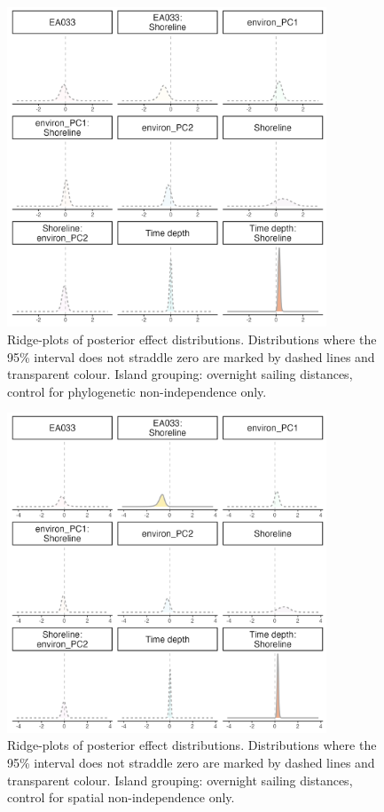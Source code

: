\documentclass[unnumsec,webpdf,modern,medium]{oup-authoring-template}
\begin{document}
\begin{figure}[ht]
\includegraphics[width=0.85\textwidth]{brms_SBZR_control_phylo_group_full_effect_ridge_panels_plot.png}
\caption{Ridge-plots of posterior effect distributions. Distributions where the 95\% interval does not straddle zero are marked by dashed lines and transparent colour. Island grouping: overnight sailing distances, control for phylogenetic non-independence only.}
\label{brms_SBZR_group_full_effect_ridge_panels_phylo}
\end{figure}



\begin{figure}[ht]
\includegraphics[width=0.85\textwidth]{brms_SBZR_control_spatial_group_full_effect_ridge_panels_plot.png}
\caption{Ridge-plots of posterior effect distributions. Distributions where the 95\% interval does not straddle zero are marked by dashed lines and transparent colour. Island grouping: overnight sailing distances, control for spatial non-independence only.}
\label{brms_SBZR_control_spatial_group_full_effect_ridge_panels_plot}
\end{figure}
\end{document}
